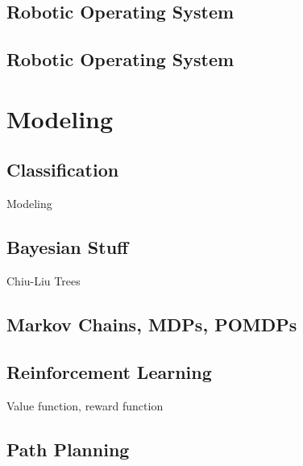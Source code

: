 \subsection{Robotic Operating System}

\subsection{Robotic Operating System}

\section{Modeling}

\subsection{Classification}
Modeling 

\subsection{Bayesian Stuff}
Chiu-Liu Trees

\subsection{Markov Chains, MDPs, POMDPs}

\subsection{Reinforcement Learning}
Value function, reward function

\subsection{Path Planning}

